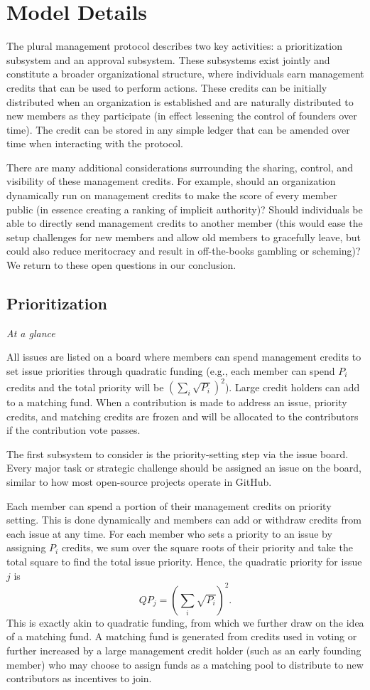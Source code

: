 \documentclass{article}
\begin{document}
\section{Model Details}
The plural management protocol describes two key activities: a prioritization subsystem and an approval subsystem. These subsystems exist jointly and constitute a broader organizational structure, where individuals earn management credits that can be used to perform actions. These credits can be initially distributed when an organization is established and are naturally distributed to new members as they participate (in effect lessening the control of founders over time). The credit can be stored in any simple ledger that can be amended over time when interacting with the protocol.

There are many additional considerations surrounding the sharing, control, and visibility of these management credits. For example, should an organization dynamically run on management credits to make the score of every member public (in essence creating a ranking of implicit authority)? Should individuals be able to directly send management credits to another member (this would ease the setup challenges for new members and allow old members to gracefully leave, but could also reduce meritocracy and result in off-the-books gambling or scheming)? We return to these open questions in our conclusion.

\subsection{Prioritization}
\textit{At a glance}

All issues are listed on a board where members can spend management credits to set issue priorities through quadratic funding (e.g., each member can spend $P_i$ credits and the total priority will be $\left( \sum_i \sqrt{P_i} \right)^2$). Large credit holders can add to a matching fund. When a contribution is made to address an issue, priority credits, and matching credits are frozen and will be allocated to the contributors if the contribution vote passes.

The first subsystem to consider is the priority-setting step via the issue board. Every major task or strategic challenge should be assigned an issue on the board, similar to how most open-source projects operate in GitHub.

Each member can spend a portion of their management credits on priority setting. This is done dynamically and members can add or withdraw credits from each issue at any time. For each member who sets a priority to an issue by assigning $P_i$ credits, we sum over the square roots of their priority and take the total square to find the total issue priority. Hence, the quadratic priority for issue $j$ is 
\[ QP_j = \left( \sum_i \sqrt{P_i} \right)^2. \]
This is exactly akin to quadratic funding, from which we further draw on the idea of a matching fund. A matching fund is generated from credits used in voting or further increased by a large management credit holder (such as an early founding member) who may choose to assign funds as a matching pool to distribute to new contributors as incentives to join.
\end{document}
